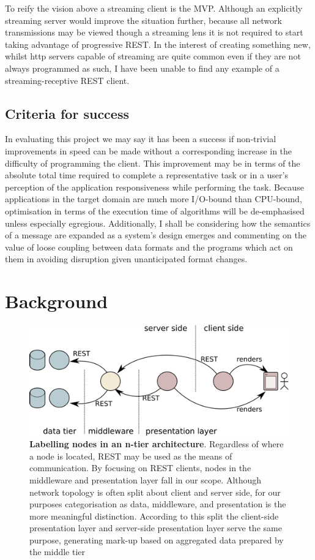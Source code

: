 \documentclass[12pt, ]{article}
\makeatletter
\let\stdsection\section
\renewcommand\section{\newpage\stdsection}
\def\maxwidth{\ifdim\Gin@nat@width>\linewidth\linewidth
\else\Gin@nat@width\fi}
\let\Oldincludegraphics\includegraphics
\renewcommand{\includegraphics}[1]{\Oldincludegraphics[width=\maxwidth]{#1}}
\makeatother
\begin{document}
To reify the vision above a streaming client is the MVP. Although an
explicitly streaming server would improve the situation further, because
all network transmissions may be viewed though a streaming lens it is
not required to start taking advantage of progressive REST. In the
interest of creating something new, whilst http servers capable of
streaming are quite common even if they are not always programmed as
such, I have been unable to find any example of a streaming-receptive
REST client.

\subsection{Criteria for success}\label{criteria-for-success}

In evaluating this project we may say it has been a success if
non-trivial improvements in speed can be made without a corresponding
increase in the difficulty of programming the client. This improvement
may be in terms of the absolute total time required to complete a
representative task or in a user's perception of the application
responsiveness while performing the task. Because applications in the
target domain are much more I/O-bound than CPU-bound, optimisation in
terms of the execution time of algorithms will be de-emphasised unless
especially egregious. Additionally, I shall be considering how the
semantics of a message are expanded as a system's design emerges and
commenting on the value of loose coupling between data formats and the
programs which act on them in avoiding disruption given unanticipated
format changes.

\section{Background}\label{background}

\begin{figure}[htbp]
\centering
\includegraphics{images/architecture.png}
\caption{\textbf{Labelling nodes in an n-tier architecture}. Regardless
of where a node is located, REST may be used as the means of
communication. By focusing on REST clients, nodes in the middleware and
presentation layer fall in our scope. Although network topology is often
split about client and server side, for our purposes categorisation as
data, middleware, and presentation is the more meaningful distinction.
According to this split the client-side presentation layer and
server-side presentation layer serve the same purpose, generating
mark-up based on aggregated data prepared by the middle tier
\label{architecture}}
\end{figure}
\end{document}
